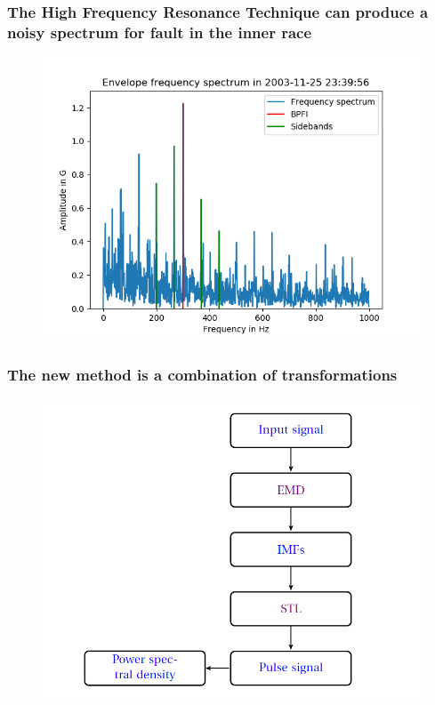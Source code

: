 \documentclass{beamer}
\begin{document}

\begin{frame}
	\frametitle{The High Frequency Resonance Technique can produce a noisy spectrum for fault in the inner race}
	\begin{figure}[H]
		\centering
		\includegraphics[width=0.8\linewidth]{bpfi_sidebands}
	\end{figure}
\end{frame}

\begin{frame}
	\frametitle{The new method is a combination of transformations}
	\begin{figure}[H]
		\centering
		\includegraphics[width=0.8\linewidth]{new_method}
	\end{figure}
\end{frame}
\end{document}
